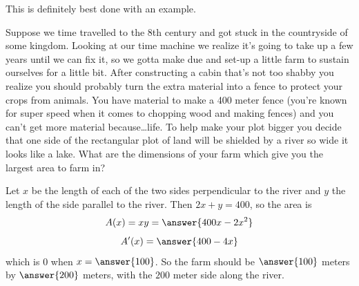 \documentclass{ximera}
\begin{document}
This is definitely best done with an example.

\begin{example}\label{example:10-16}
Suppose we time travelled to the 8th century and got stuck in the countryside of some kingdom. Looking at our time machine we realize it's going to take up a few years until we can fix it, so we gotta make due and set-up a little farm to sustain ourselves for a little bit. After constructing a cabin that's not too shabby you realize you should probably turn the extra material into a fence to protect your crops from animals. You have material to make a 400 meter fence (you're known for super speed when it comes to chopping wood and making fences) and you can't get more material because\ldots life. To help make your plot bigger you decide that one side of the rectangular plot of land will be shielded by a river so wide it looks like a lake. What are the dimensions of your farm which give you the largest area to farm in?

Let $x$ be the length of each of the two sides perpendicular to the river and $y$ the length of the side parallel to the river. Then $2x+y=400$, so the area is
\[
A(x)=xy=\answer{400x-2x^{2}}
\]
\[
A^{\prime}(x)=\answer{400-4x}
\]
which is $0$ when $x=\answer{100}$. So the farm should be $\answer{100}$ meters by $\answer{200}$ meters, with the $200$ meter side along the river.
\end{example}
\end{document}
